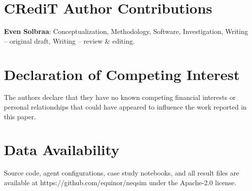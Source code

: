 \documentclass[review,3p]{elsarticle}
\begin{document}
\section{CRediT Author Contributions}

\textbf{Even Solbraa}: Conceptualization, Methodology, Software, Investigation, Writing – original draft, Writing – review & editing.

\section{Declaration of Competing Interest}

The authors declare that they have no known competing financial interests or personal relationships that could have appeared to influence the work reported in this paper.

\section{Data Availability}

Source code, agent configurations, case study notebooks, and all result files are available at https://github.com/equinor/neqsim under the Apache-2.0 license.




\end{document}
